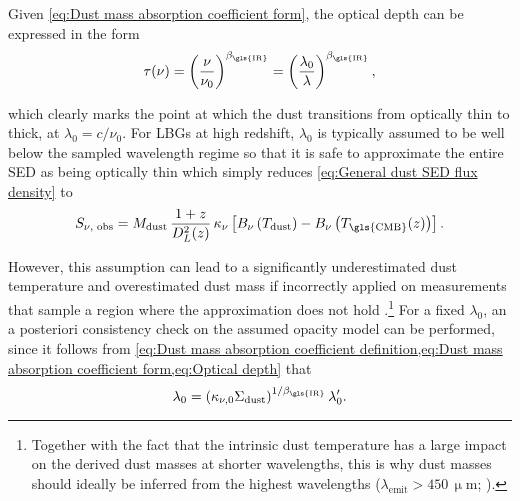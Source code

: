 Given \cref{eq:Dust mass absorption coefficient form}, the optical depth can be expressed in the form
\begin{equation}
    \label{eq:Optical depth}
    \tau (\nu) = \left( \frac{\nu}{\nu_0} \right)^{\beta_\text{\gls{IR}}} = \left( \frac{\lambda_0}{\lambda} \right)^{\beta_\text{\gls{IR}}},
\end{equation}

\noindent {} which clearly marks the point at which the dust transitions from optically thin to thick, at $\lambda_0 = c/\nu_0$. For \glspl{LBG} at high redshift, $\lambda_0$ is typically assumed to be well below the sampled wavelength regime so that it is safe to approximate the entire \gls{SED} as being optically thin \citep[$\tau (\nu) \ll 1$; e.g.][]{2021MNRAS.508L..58B} which simply reduces \cref{eq:General dust SED flux density} to \citep{2014PhR...541...45C}
\begin{equation}
    \label{eq:OT dust SED flux density}
    S_{\nu\text{, obs}} = M_\text{dust} \, \frac{1+z}{D_L^2 (z)} \, \kappa_\nu \left[ B_\nu \left(T_\text{dust} \right) - B_\nu \left(T_\text{\gls{CMB}} (z) \right) \right].
\end{equation}

 However, this assumption can lead to a significantly underestimated dust temperature and overestimated dust mass if incorrectly applied on measurements that sample a region where the approximation does not hold \citep{2020A&A...634L..14C, 2020MNRAS.498.4109J}.\footnote{Together with the fact that the intrinsic dust temperature has a large impact on the derived dust masses at shorter wavelengths, this is why dust masses should ideally be inferred from the highest wavelengths ($\lambda_\text{emit} > 450 \, \mathrm{\upmu m}$; \citealt{2012MNRAS.425.3094C}).} For a fixed $\lambda_0$, an a posteriori consistency check on the assumed opacity model can be performed, since it follows from \cref{eq:Dust mass absorption coefficient definition,eq:Dust mass absorption coefficient form,eq:Optical depth} that
\begin{equation}
    \label{eq:Consistent l0}
    \lambda_0 = \left( \kappa_{\nu, 0} \Sigma_\text{dust} \right)^{1/\beta_\text{\gls{IR}}} \lambda_0^\prime.
\end{equation}

